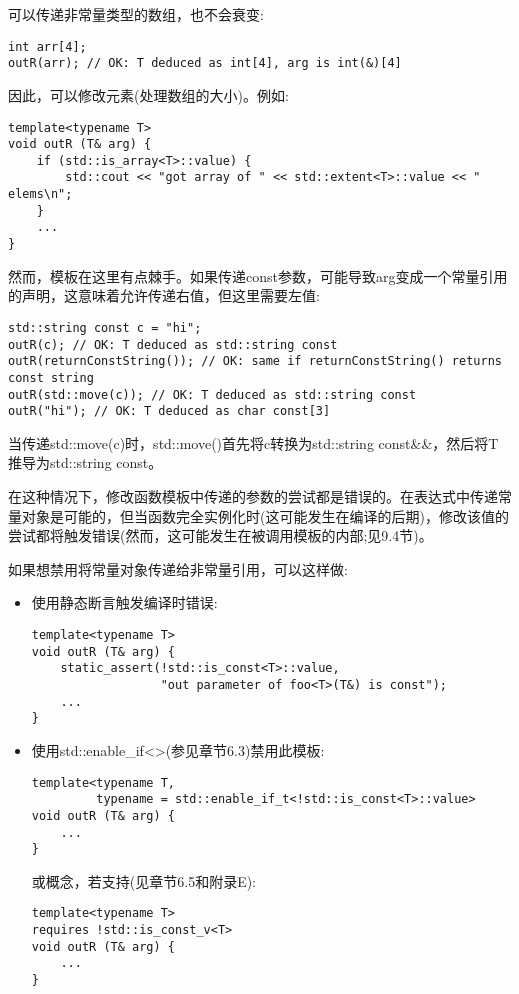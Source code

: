 可以传递非常量类型的数组，也不会衰变:

\begin{lstlisting}[style=styleCXX]
int arr[4];
outR(arr); // OK: T deduced as int[4], arg is int(&)[4]
\end{lstlisting}

因此，可以修改元素(处理数组的大小)。例如:

\begin{lstlisting}[style=styleCXX]
template<typename T>
void outR (T& arg) {
	if (std::is_array<T>::value) {
		std::cout << "got array of " << std::extent<T>::value << " elems\n";
	}
	...
}
\end{lstlisting}

然而，模板在这里有点棘手。如果传递const参数，可能导致arg变成一个常量引用的声明，这意味着允许传递右值，但这里需要左值:

\begin{lstlisting}[style=styleCXX]
std::string const c = "hi";
outR(c); // OK: T deduced as std::string const
outR(returnConstString()); // OK: same if returnConstString() returns const string
outR(std::move(c)); // OK: T deduced as std::string const
outR("hi"); // OK: T deduced as char const[3]
\end{lstlisting}

\begin{tcolorbox}[colback=webgreen!5!white,colframe=webgreen!75!black]
\hspace*{0.75cm}当传递std::move(c)时，std::move()首先将c转换为std::string const\&\&，然后将T推导为std::string const。
\end{tcolorbox}

在这种情况下，修改函数模板中传递的参数的尝试都是错误的。在表达式中传递常量对象是可能的，但当函数完全实例化时(这可能发生在编译的后期)，修改该值的尝试都将触发错误(然而，这可能发生在被调用模板的内部;见9.4节)。

如果想禁用将常量对象传递给非常量引用，可以这样做:

\begin{itemize}
\item 
使用静态断言触发编译时错误:

\begin{lstlisting}[style=styleCXX]
template<typename T>
void outR (T& arg) {
	static_assert(!std::is_const<T>::value,
				  "out parameter of foo<T>(T&) is const");
	...
}
\end{lstlisting}

\item 
使用std::enable\_if<>(参见章节6.3)禁用此模板:

\begin{lstlisting}[style=styleCXX]
template<typename T,
		 typename = std::enable_if_t<!std::is_const<T>::value>
void outR (T& arg) {
	...
}
\end{lstlisting}

或概念，若支持(见章节6.5和附录E):

\begin{lstlisting}[style=styleCXX]
template<typename T>
requires !std::is_const_v<T>
void outR (T& arg) {
	...
}
\end{lstlisting}

\end{itemize}

